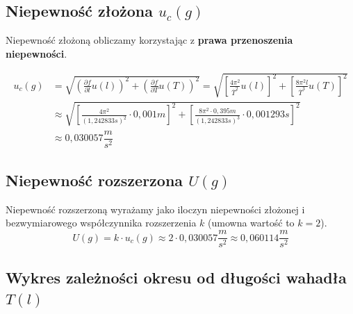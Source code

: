 \documentclass[a4paper,11pt]{article}
\begin{document}
\subsection{Niepewność złożona $u_{c}(g)$}
Niepewność złożoną obliczamy korzystając z \textbf{prawa przenoszenia niepewności}.
\begin{center}
\begin{align*}
u_{c}(g)&=\sqrt{\left(\frac{\partial f}{\partial l}u(l)\right)^{2}+\left(\frac{\partial f}{\partial T}u(T)\right)^{2}}=\sqrt{\left[\frac{4\pi^{2}}{\overline{T}^{2}}u(l)\right]^{2}+\left[\frac{8\pi^{2}l}{\overline{T}^{3}}u(T)\right]^{2}}\\
&\approx\sqrt{\left[\frac{4\pi^{2}}{(1,242833s)^{2}}\cdot0,001m\right]^{2}+\left[\frac{8\pi^{2}\cdot0,395m}{(1,242833s)^{3}}\cdot0,001293s\right]^{2}}\\
&\approx0,030057\dfrac{m}{s^{2}}
\end{align*}
\end{center}

\subsection{Niepewność rozszerzona $U(g)$}

Niepewność rozszerzoną wyrażamy jako iloczyn niepewności złożonej i bezwymiarowego współczynnika rozszerzenia $k$ (umowna wartość to $k=2$).
$$
U(g)=k \cdot u_{c}(g)\approx 2 \cdot0,030057\frac{m}{s^{2}}\approx0,060114\frac{m}{s^{2}}
$$
\subsection{Wykres zależności okresu od długości wahadła $T(l)$}

\begin{center}
\end{center}
\end{document}
